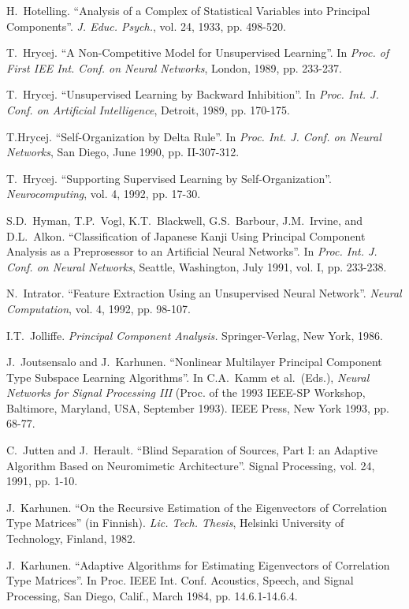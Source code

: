 \begin{thebibliography}{999}
H.~Hotelling.
``Analysis of a Complex of Statistical Variables into Principal Components''.
{\em J. Educ. Psych.}, vol. 24, 1933, pp. 498-520.
 
T.~Hrycej.
``A Non-Competitive Model for Unsupervised Learning''.
In {\em  Proc. of First IEE Int. Conf. on Neural Networks},
London, 1989, pp. 233-237.

T.~Hrycej.
``Unsupervised Learning by Backward Inhibition''.
In {\em Proc. Int. J. Conf. on Artificial Intelligence}, Detroit, 1989,
pp. 170-175.

T.Hrycej.
``Self-Organization by Delta Rule''.
In {\em Proc. Int. J. Conf. on Neural Networks},
San Diego, June 1990, pp. II-307-312.

T.~Hrycej.
``Supporting Supervised Learning by Self-Organization''.
{\em Neurocomputing}, vol. 4, 1992, pp. 17-30.

S.D.~Hyman, T.P.~Vogl, K.T.~Blackwell, G.S.~Barbour, J.M.~Irvine, and
D.L.~Alkon.
``Classification of Japanese Kanji Using Principal Component Analysis as
a Preprosessor to an Artificial Neural Networks''.
In {\em Proc. Int. J. Conf. on Neural Networks}, Seattle, Washington,
July 1991, vol. I, pp. 233-238.

N.~Intrator.
``Feature Extraction Using an Unsupervised Neural Network''.
{\em Neural Computation}, vol. 4, 1992, pp. 98-107.
 
I.T.~Jolliffe. 
{\em Principal Component Analysis.}
Springer-Verlag, New York, 1986.

J.~Joutsensalo and J.~Karhunen.
``Nonlinear Multilayer Principal Component Type Subspace
Learning Algorithms''.
In C.A.~Kamm et al.\ (Eds.), {\em Neural Networks for Signal
Processing III} (Proc. of the 1993 IEEE-SP Workshop, Baltimore, Maryland,
USA, September 1993). IEEE Press, New York 1993, pp. 68-77.

C.~Jutten and J.~Herault.
``Blind Separation of Sources, Part I: an Adaptive Algorithm Based on
Neuromimetic Architecture''. Signal Processing, vol. 24, 1991, pp. 1-10.

J.~Karhunen.
``On the Recursive Estimation of the Eigenvectors of
Correlation Type Matrices'' (in Finnish).
{\em Lic. Tech. Thesis}, Helsinki University of Technology,
Finland, 1982.

J.~Karhunen.
``Adaptive Algorithms for Estimating Eigenvectors of
Correlation Type Matrices''.
In {Proc. IEEE Int. Conf. Acoustics, Speech, and Signal
Processing}, San Diego, Calif., March 1984, pp. 14.6.1-14.6.4.


\end{thebibliography}
